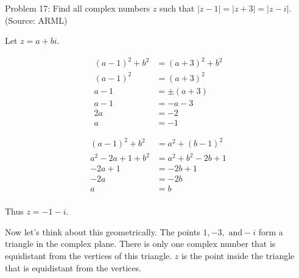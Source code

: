 Problem 17: Find all complex numbers $z$ such that $|z - 1| = |z + 3| = |z - i|$. (Source: ARML)

Let $z = a + bi$.

\begin{align*}
(a - 1)^2 + b^2 &= (a + 3)^2 + b^2 \\
(a - 1)^2 &= (a + 3)^2 \\
a - 1 &= \pm (a + 3) \\
a - 1 &= -a - 3 \\
2a &= -2 \\
a &= -1
\end{align*}

\begin{align*}
(a - 1)^2 + b^2 &= a^2 + (b - 1)^2 \\
a^2 - 2a + 1 + b^2 &= a^2 + b^2 - 2b + 1 \\
-2a + 1 &= -2b + 1 \\
-2a &= -2b \\
a &= b \\
\end{align*}

Thus $\boxed{z = -1 - i}$.

Now let's think about this geometrically. The points $1, -3, \text{ and} -i$ form a triangle in the complex plane. There is only one complex number that is equidistant from the vertices of this triangle. $z$ is the point inside the triangle that is equidistant from the vertices.
